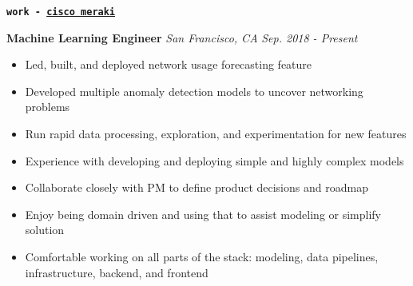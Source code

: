 \documentclass{article}[14pt]
\newenvironment{cvsection}[2] {
  \begin{tcolorbox}[
    standard jigsaw, %
    opacityback=0,   %
    top=0mm,         %
    bottom=0mm,      %
    boxrule=0pt,     %
    enhanced,        %
    frame code={
      \path[draw=#2,line width=3pt]
        (frame.south west) --
        ([yshift=-0.29cm] frame.north west) --
        ([yshift=-0.29cm, xshift=0.2\linewidth] frame.north west);
    }
  ]
  \hspace{0.20\linewidth}
  \textbf{\texttt{\Large{#1}}}
  \large
  \vspace{5pt}
  \newline
}
{ \end{tcolorbox} }
\newenvironment{tightemize}
{\vspace{-2pt}\begin{itemize}[leftmargin=*]\itemsep4pt \parskip0pt \parsep0pt}
{\end{itemize}}
\newcommand{\header}[1]{{\large\textbf{#1}}\newline}
\newcommand{\locationdate}[2]{\textit{#1} \hfill \textit{#2}}
\begin{document}
\vspace{1pt}
\begin{cvsection}{work - \href{https://meraki.cisco.com/}{cisco meraki}}{C1}
  \header{ Machine Learning Engineer }
  \locationdate{San Francisco, CA}{Sep. 2018 - Present}
  \begin{tightemize}
    \item Led, built, and deployed network usage forecasting feature
    \item Developed multiple anomaly detection models to uncover networking problems
    \item Run rapid data processing, exploration, and experimentation for new features
    \item Experience with developing and deploying simple and highly complex models
    \item Collaborate closely with PM to define product decisions and roadmap
    \item Enjoy being domain driven and using that to assist modeling or simplify solution
    \item Comfortable working on all parts of the stack: modeling, data pipelines, infrastructure,
      backend, and frontend




\end{tightemize}
\end{cvsection}
\end{document}
